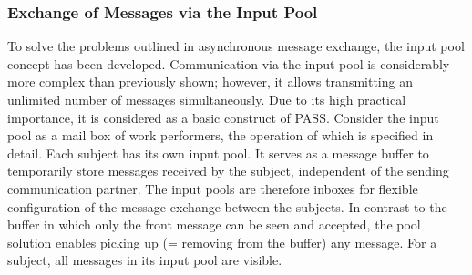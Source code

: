 \subsubsection{Exchange of Messages via the Input Pool}
\label{sec: inputpool}
To solve the problems outlined in asynchronous message exchange, the input pool concept has been developed. Communication via the input pool is considerably more complex than previously shown; however, it allows transmitting an unlimited number of messages simultaneously. Due to its high practical importance, it is considered as a basic construct of PASS.
Consider the input pool as a mail box of work performers, the operation of which is specified in detail.
Each subject has its own input pool. It serves as a message buffer to temporarily store messages received by the subject, independent of the sending communication partner. The input pools are therefore inboxes for flexible configuration of the message exchange between the subjects. In contrast to the buffer in which only the front message can be seen and accepted, the pool solution enables picking up (= removing from the buffer) any message. For a subject, all messages in its input pool are visible.

